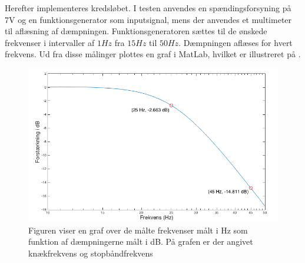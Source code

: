 Herefter implementeres kredsløbet. I testen anvendes en spændingsforsyning på 7V og en funktionsgenerator som inputsignal, mens der anvendes et multimeter til aflæsning af dæmpningen. Funktionsgeneratoren sættes til de ønskede frekvenser i intervaller af $1Hz$ fra $15Hz$ til $50Hz$. Dæmpningen aflæses for hvert frekvens. Ud fra disse målinger plottes en graf i MatLab, hvilket er illustreret på .  

\begin{figure}[H]
	\centering
	\includegraphics[scale=0.4]{figures/cProblemloesning/Lavpas_Matlab.PNG}
	\caption{Figuren viser en graf over de målte frekvenser målt i Hz som funktion af dæmpningerne målt i dB. På grafen er der angivet knækfrekvens og stopbåndfrekvens}
	\label{fig:Lavpas_Matlab}
\end{figure}



